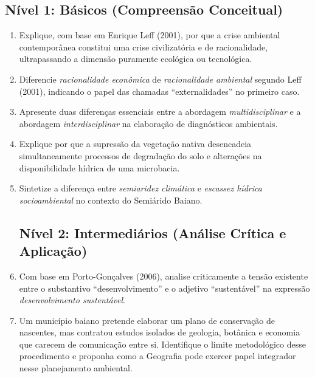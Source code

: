 
\subsection*{Nível 1: Básicos (Compreensão Conceitual)}

\begin{enumerate}[leftmargin=1.8em, itemsep=4pt]
  \item Explique, com base em Enrique Leff (2001), por que a crise ambiental contemporânea constitui uma crise civilizatória e de racionalidade, ultrapassando a dimensão puramente ecológica ou tecnológica.
  \espacoResolucao[1.8cm]

  \item Diferencie \emph{racionalidade econômica} de \emph{racionalidade ambiental} segundo Leff (2001), indicando o papel das chamadas ``externalidades'' no primeiro caso.
  \espacoResolucao[1.8cm]

  \item Apresente duas diferenças essenciais entre a abordagem \emph{multidisciplinar} e a abordagem \emph{interdisciplinar} na elaboração de diagnósticos ambientais.
  \espacoResolucao[1.8cm]

  \item Explique por que a supressão da vegetação nativa desencadeia simultaneamente processos de degradação do solo e alterações na disponibilidade hídrica de uma microbacia.
  \espacoResolucao[1.8cm]

  \item Sintetize a diferença entre \emph{semiaridez climática} e \emph{escassez hídrica socioambiental} no contexto do Semiárido Baiano.
  \espacoResolucao[1.8cm]

\subsection*{Nível 2: Intermediários (Análise Crítica e Aplicação)}

  \item Com base em Porto-Gonçalves (2006), analise criticamente a tensão existente entre o substantivo ``desenvolvimento'' e o adjetivo ``sustentável'' na expressão \emph{desenvolvimento sustentável}.
  \espacoResolucao[1.8cm]

  \item Um município baiano pretende elaborar um plano de conservação de nascentes, mas contratou estudos isolados de geologia, botânica e economia que carecem de comunicação entre si. Identifique o limite metodológico desse procedimento e proponha como a Geografia pode exercer papel integrador nesse planejamento ambiental.
  \espacoResolucao[1.8cm]


\end{enumerate}
